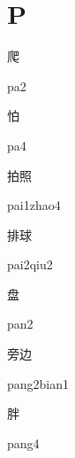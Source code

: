 ﻿%
\section*{P}
\begin{multicols*}{2}

\begin{verbete}[pa2]{爬}
\begin{pronuncia}{pa2}
\end{pronuncia}
\end{verbete}

\begin{verbete}[pa4]{怕}
\begin{pronuncia}{pa4}
\end{pronuncia}
\end{verbete}

\begin{verbete}{拍照}
\begin{pronuncia}{pai1zhao4}
\end{pronuncia}
\end{verbete}

\begin{verbete}{排球}
\begin{pronuncia}{pai2qiu2}
\end{pronuncia}
\end{verbete}

\begin{verbete}[pan2]{盘}
\begin{pronuncia}{pan2}
\end{pronuncia}
\end{verbete}

\begin{verbete}{旁边}
\begin{pronuncia}{pang2bian1}
\end{pronuncia}
\end{verbete}

\begin{verbete}[pang4]{胖}
\begin{pronuncia}{pang4}
\end{pronuncia}
\end{verbete}


\end{multicols*}
